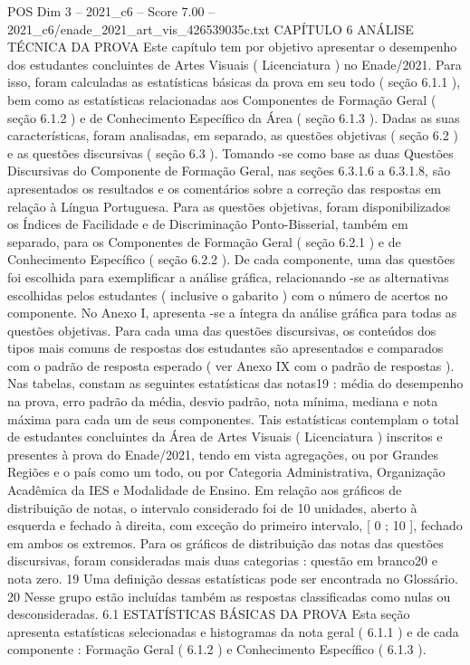 \begin{textsample}{POS Dim 3 – 2021\_c6 – Score 7.00 – 2021\_c6/enade\_2021\_art\_vis\_426539035c.txt}  \label{ex:f3_pos_045}
CAPÍTULO 6 ANÁLISE TÉCNICA DA PROVA Este capítulo tem por objetivo apresentar o desempenho dos estudantes concluintes de Artes Visuais ( Licenciatura ) no Enade/2021.
Para isso, foram calculadas as estatísticas básicas da prova em seu todo ( seção 6.1.1 ), bem como as estatísticas relacionadas aos Componentes de Formação Geral ( seção 6.1.2 ) e de Conhecimento Específico da Área ( seção 6.1.3 ).
Dadas as suas características, foram analisadas, em separado, as questões objetivas ( seção 6.2 ) e as questões discursivas ( seção 6.3 ).
Tomando -se como base as duas Questões Discursivas do Componente de Formação Geral, nas seções 6.3.1.6 a 6.3.1.8, são apresentados os resultados e os comentários sobre a correção das respostas em relação à Língua Portuguesa.
Para as questões objetivas, foram disponibilizados os Índices de Facilidade e de Discriminação Ponto-Bisserial, também em separado, para os Componentes de Formação Geral ( seção 6.2.1 ) e de Conhecimento Específico ( seção 6.2.2 ).
De cada componente, uma das questões foi escolhida para exemplificar a análise gráfica, relacionando -se as alternativas escolhidas pelos estudantes ( inclusive o gabarito ) com o número de acertos no componente.
No Anexo I, apresenta -se a íntegra da análise gráfica para todas as questões objetivas.
Para cada uma das questões discursivas, os conteúdos dos tipos mais comuns de respostas dos estudantes são apresentados e comparados com o padrão de resposta esperado ( ver Anexo IX com o padrão de respostas ).
Nas tabelas, constam as seguintes estatísticas das notas19 : média do desempenho na prova, erro padrão da média, desvio padrão, nota mínima, mediana e nota máxima para cada um de seus componentes.
Tais estatísticas contemplam o total de estudantes concluintes da Área de Artes Visuais ( Licenciatura ) inscritos e presentes à prova do Enade/2021, tendo em vista agregações, ou por Grandes Regiões e o país como um todo, ou por Categoria Administrativa, Organização Acadêmica da IES e Modalidade de Ensino.
Em relação aos gráficos de distribuição de notas, o intervalo considerado foi de 10 unidades, aberto à esquerda e fechado à direita, com exceção do primeiro intervalo, [ 0 ; 10 ], fechado em ambos os extremos.
Para os gráficos de distribuição das notas das questões discursivas, foram consideradas mais duas categorias : questão em branco20 e nota zero. 19 Uma definição dessas estatísticas pode ser encontrada no Glossário. 20 Nesse grupo estão incluídas também as respostas classificadas como nulas ou desconsideradas. 6.1 ESTATÍSTICAS BÁSICAS DA PROVA Esta seção apresenta estatísticas selecionadas e histogramas da nota geral ( 6.1.1 ) e de cada componente : Formação Geral ( 6.1.2 ) e Conhecimento Específico ( 6.1.3 ).

\end{textsample}
